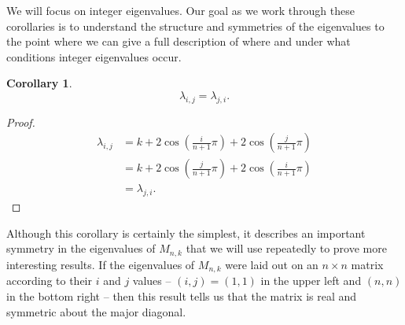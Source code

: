 \documentclass[12pt]{article}
\newtheorem{corollary}{Corollary}
\begin{document}
	We will focus on integer eigenvalues.
	Our goal as we work through these corollaries is to understand the structure
	and symmetries of the eigenvalues to the point where we can give a full
	description of where and under what conditions integer eigenvalues occur.
	
	\begin{corollary}
		\begin{equation*}
		\lambda_{i,j} = \lambda_{j,i}.
		\end{equation*}
	\end{corollary}
	\begin{proof}\label{cor:majorsymmetry}
		\begin{align*}
		\lambda_{i,j} &= k + 2\cos{\left(\frac{i}{n+1}\pi\right)} +
		2\cos{\left(\frac{j}{n+1}\pi\right)} \\
		&= k + 2\cos{\left(\frac{j}{n+1}\pi\right)} +
		2\cos{\left(\frac{i}{n+1}\pi\right)} \\
		&= \lambda_{j,i}.
		\end{align*}
	\end{proof}
	Although this corollary is certainly the simplest, it describes an important
	symmetry in the eigenvalues of $M_{n,k}$ that we will use repeatedly to prove
	more interesting results.
	If the eigenvalues of $M_{n,k}$ were laid out on an $n \times n$ matrix
	according to their $i$ and $j$ values -- $(i,j)=(1,1)$ in the upper left and
	$(n,n)$ in the bottom right -- then this result tells us that the matrix is real
	and symmetric about the major diagonal.
	
\end{document}
